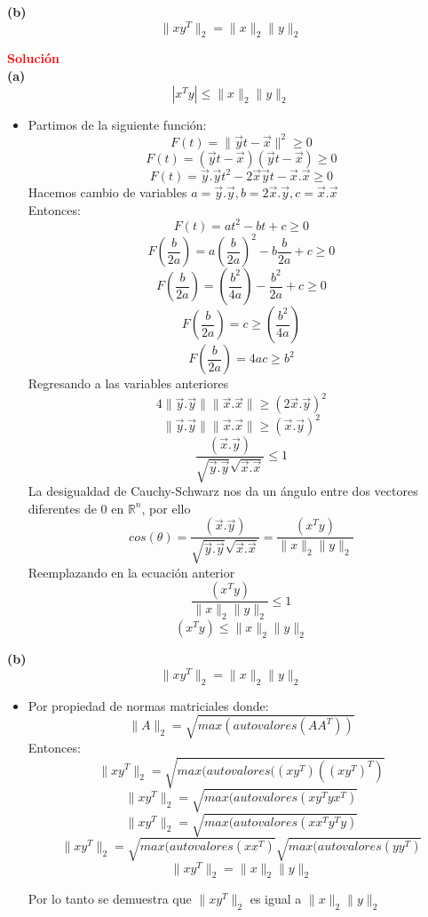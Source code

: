 \documentclass[12pt]{article}
\begin{document}
\textbf{(b)}
\[
    \|xy^{T}\|_2 = \|x\|_2\|y\|_2 
\]

\noindent \textcolor{red}{\bf Solución}\\
\textbf{(a)}
\[
    |x^{T}y| \leq \|x\|_2\|y\|_2 
\]
    \begin{itemize}
        \item 
        Partimos de la siguiente función:
        \[
            F(t) = \|\vec{y}t-\vec{x}\|^2 \geq 0
        \]
        \[
            F(t) = (\vec{y}t-\vec{x})(\vec{y}t-\vec{x}) \geq 0  
        \]
        \[
            F(t) = \vec{y}.\vec{y}t^2-2\vec{x}\vec{y}t-\vec{x}.\vec{x} \geq 0
        \]
        Hacemos cambio de variables $a = \vec{y}.\vec{y}, b = 2\vec{x}.\vec{y}, c = \vec{x}.\vec{x}$\\
        Entonces:
        \[
            F(t) = at^2-bt+c \geq 0 
        \]
        \[
            F(\frac{b}{2a}) = a(\frac{b}{2a})^2-b\frac{b}{2a}+c \geq 0
        \]
        \[
            F(\frac{b}{2a}) = (\frac{b^2}{4a})-\frac{b^2}{2a}+c \geq 0
        \]
        \[
             F(\frac{b}{2a}) = c \geq (\frac{b^2}{4a})
        \]
        \[
             F(\frac{b}{2a}) = 4ac \geq b^2
        \]
        Regresando a las variables anteriores
        \[
             4\|\vec{y}.\vec{y}\|\|\vec{x}.\vec{x}\| \geq  (2\vec{x}.\vec{y})^2
        \]
        \[
            \|\vec{y}.\vec{y}\|\|\vec{x}.\vec{x}\| \geq  (\vec{x}.\vec{y})^2
        \]
        \[
            \frac{(\vec{x}.\vec{y})}{\sqrt{\vec{y}.\vec{y}}\sqrt{\vec{x}.\vec{x}}} \leq  1
        \]
        La desigualdad de Cauchy-Schwarz nos da un ángulo entre dos vectores diferentes de 0 en $\mathbb{R}^n$, por ello
        \[
            cos(\theta) = \frac{(\vec{x}.\vec{y})}{\sqrt{\vec{y}.\vec{y}}\sqrt{\vec{x}.\vec{x}}} = \frac{(x^Ty)}{\|x\|_2\|y\|_2}
        \]
        Reemplazando en la ecuación anterior
        \[
            \frac{(x^{T}y)}{\|x\|_2\|y\|_2} \leq  1
        \]
        \[
            (x^{T}y) \leq  \|x\|_2\|y\|_2
        \]
    
    \end{itemize}
    
\textbf{(b)}
\[
    \|xy^{T}\|_2 = \|x\|_2\|y\|_2 
\]

     \begin{itemize}
        \item Por propiedad de  normas matriciales donde:
    \[
        \|A\|_2 = \sqrt{max(autovalores(AA^{T}))}
    \]
    Entonces:
    \[
        \|xy^{T}\|_2 = \sqrt{max(autovalores((xy^{T})((xy^{T})^{T})}
    \]
    \[
        \|xy^{T}\|_2 = \sqrt{max(autovalores(xy^{T}yx^{T})}
    \]
    \[
        \|xy^{T}\|_2 = \sqrt{max(autovalores(xx^{T}y^{T}y)}
    \]
    \[
        \|xy^{T}\|_2 = \sqrt{max(autovalores(xx^{T})}\sqrt{max(autovalores(yy^{T})}
    \]
    \[
        \|xy^{T}\|_2 = \|x\|_2\|y\|_2
    \]
    
    Por lo tanto se demuestra que $\|xy^{T}\|_2$ es igual a $\|x\|_2\|y\|_2$
        
    \end{itemize}
\end{document}
